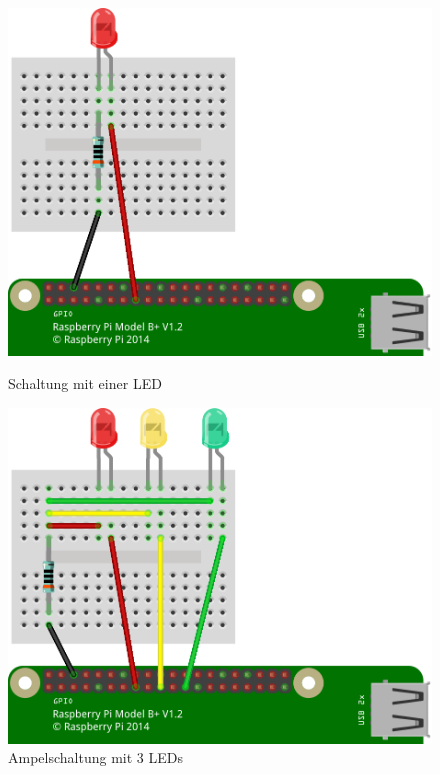 \documentclass{\VorlagenPfad/coderdojokatext}
\begin{document}
\begin{figure}[htb]
	\centering
	\begin{minipage}[t]{0.45\linewidth}
		\centering
		\includegraphics[width=.9\textwidth]{ampel/eine_led_bb.png}
		\caption{Schaltung mit einer LED}
	\end{minipage}%
	\hfill
	\begin{minipage}[t]{0.45\linewidth}
		\centering
		\includegraphics[width=.9\textwidth]{ampel/ampel_bb.png}
		\caption{Ampelschaltung mit 3 LEDs}
	\end{minipage}
\end{figure}
\end{document}
